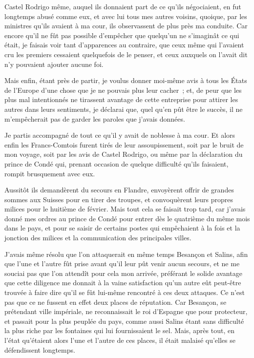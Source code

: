 \documentclass[french,twoside]{book} %
\begin{document}
Castel Rodrigo même, auquel ils donnaient part de ce qu’ils négociaient, en fut longtemps abusé comme eux, et avec lui tous mes autres voisins, quoique, par les ministres qu’ils avaient à ma cour, ils observassent de plus près ma conduite. Car encore qu’il ne fût pas possible d’empêcher que quelqu’un ne s’imaginât ce qui était, je faisais voir tant d’apparences au contraire, que ceux même qui l’avaient cru les premiers cessaient quelquefois de le penser, et ceux auxquels on l’avait dit n’y pouvaient ajouter aucune foi.\par
Mais enfin, étant près de partir, je voulus donner moi-même avis à tous les États de l’Europe d’une chose que je ne pouvais plus leur cacher ; et, de peur que les plus mal intentionnés ne tirassent avantage de cette entreprise pour attirer les autres dans leurs sentiments, je déclarai que, quel qu’en pût être le succès, il ne m’empêcherait pas de garder les paroles que j’avais données.\par
Je partis accompagné de tout ce qu’il y avait de noblesse à ma cour. Et alors enfin les Francs-Comtois furent tirés de leur assoupissement, soit par le bruit de mon voyage, soit par les avis de Castel Rodrigo, ou même par la déclaration du prince de Condé qui, prenant occasion de quelque difficulté qu’ils faisaient, rompit brusquement avec eux.\par
Aussitôt ils demandèrent du secours en Flandre, envoyèrent offrir de grandes sommes aux Suisses pour en tirer des troupes, et convoquèrent leurs propres milices pour le huitième de février. Mais tout cela se faisait trop tard, car j’avais donné mes ordres au prince de Condé pour entrer dès le quatrième du même mois dans le pays, et pour se saisir de certains postes qui empêchaient à la fois et la jonction des milices et la communication des principales villes.\par
J’avais même résolu que l’on attaquerait en même temps Besançon et Salins, afin que l’une et l’autre fût prise avant qu’il leur pût venir aucun secours, et ne me souciai pas que l’on attendît pour cela mon arrivée, préférant le solide avantage que cette diligence me donnait à la vaine satisfaction qu’un autre eût peut-être trouvée à faire dire qu’il se fût lui-même rencontré à ces deux attaques. Ce n’est pas que ce ne fussent en effet deux places de réputation. Car Besançon, se prétendant ville impériale, ne reconnaissait le roi d’Espagne que pour protecteur, et passait pour la plus peuplée du pays, comme aussi Salins étant sans difficulté la plus riche par les fontaines qui lui fournissaient le sel. Mais, après tout, en l’état qu’étaient alors l’une et l’autre de ces places, il était malaisé qu’elles se défendissent longtemps.\par
\end{document}
